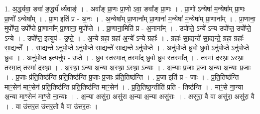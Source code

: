\documentclass[17pt]{extarticle}
\begin{document}
1. अ॒र्द्ध्यवा॒ ङवा॑ ङ॒र्द्ध्य॑ र्ध्यवाङ्॑ । . अवा᳚ङ् प्रा॒णः प्रा॒णो ऽवा॒ ङवा᳚ङ् प्रा॒णः । . प्रा॒णो᳚ ऽन्येषा॑ म॒न्येषा᳚म् प्रा॒णः प्रा॒णो᳚ ऽन्येषा᳚म् । . प्रा॒ण इति॑ प्र - अ॒नः । . अ॒न्येषा᳚म् प्रा॒णाना᳚म् प्रा॒णाना॑ म॒न्येषा॑ म॒न्येषा᳚म् प्रा॒णाना᳚म् । . प्रा॒णाना॒ मुपो᳚प्त॒ उपो᳚प्ते प्रा॒णाना᳚म् प्रा॒णाना॒ मुपो᳚प्ते । . प्रा॒णाना॒मिति॑ प्र - अ॒नाना᳚म् । . उपो᳚प्ते॒ ऽन्ये᳚ ऽन्य उपो᳚प्त॒ उपो᳚प्ते॒ ऽन्ये । . उपो᳚प्त॒ इत्युप॑ - उ॒प्ते॒ । . अ॒न्ये ग्रहा॒ ग्रहा॑ अ॒न्ये᳚ ऽन्ये ग्रहाः᳚ । . ग्रहाः᳚ सा॒द्यन्ते॑ सा॒द्यन्ते॒ ग्रहा॒ ग्रहाः᳚ सा॒द्यन्ते᳚ । . सा॒द्यन्ते ऽनु॑पो॒प्ते ऽनु॑पोप्ते सा॒द्यन्ते॑ सा॒द्यन्ते ऽनु॑पोप्ते । . अनु॑पोप्ते ध्रु॒वो ध्रु॒वो ऽनु॑पो॒प्ते ऽनु॑पोप्ते ध्रु॒वः । . अनु॑पोप्त॒ इत्यनु॑प - उ॒प्ते॒ । . ध्रु॒व स्तस्मा॒त् तस्मा᳚द् ध्रु॒वो ध्रु॒व स्तस्मा᳚त् । . तस्मा॑ द॒स्थ्ना ऽस्थ्ना तस्मा॒त् तस्मा॑ द॒स्थ्ना । . अ॒स्थ्ना ऽन्या अ॒न्या अ॒स्थ्ना ऽस्थ्ना ऽन्याः । . अ॒न्याः प्र॒जाः प्र॒जा अ॒न्या अ॒न्याः प्र॒जाः । . प्र॒जाः प्र॑ति॒तिष्ठ॑न्ति प्रति॒तिष्ठ॑न्ति प्र॒जाः प्र॒जाः प्र॑ति॒तिष्ठ॑न्ति । . प्र॒जा इति॑ प्र - जाः । . प्र॒ति॒तिष्ठ॑न्ति माꣳ॒॒सेन॑ माꣳ॒॒सेन॑ प्रति॒तिष्ठ॑न्ति प्रति॒तिष्ठ॑न्ति माꣳ॒॒सेन॑ । . प्र॒ति॒तिष्ठ॒न्तीति॑ प्रति - तिष्ठ॑न्ति । . माꣳ॒॒से ना॒न्या अ॒न्या माꣳ॒॒सेन॑ माꣳ॒॒से ना॒न्याः । . अ॒न्या असु॑रा॒ असु॑रा अ॒न्या अ॒न्या असु॑राः । . असु॑रा॒ वै वा असु॑रा॒ असु॑रा॒ वै । . वा उ॑त्तर॒त उ॑त्तर॒तो वै वा उ॑त्तर॒तः । \newline
\end{document}
